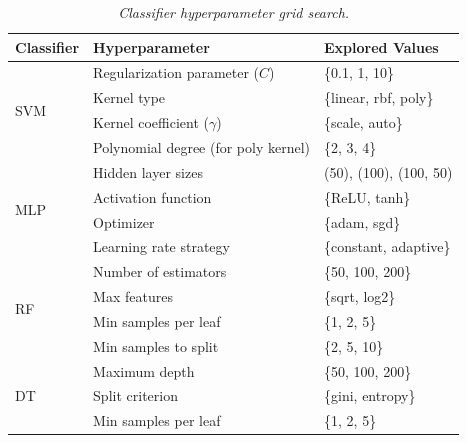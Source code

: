 \begin{table}[h]
    \centering
    \renewcommand{\arraystretch}{1.5}
    \setlength{\tabcolsep}{8pt}
    \caption{\textit{Classifier hyperparameter grid search.}}
    \label{tab:hyperparams}
    \begin{tabular}{|p{1.5cm}|p{5.2cm}|p{5.3cm}|}
        \hline
        \textbf{Classifier} & \textbf{Hyperparameter} & \textbf{Explored Values} \\ \hline

        \multirow{4}{*}{SVM} 
        & Regularization parameter ($C$) & \{0.1, 1, 10\} \\ \cline{2-3}
        & Kernel type & \{linear, rbf, poly\} \\ \cline{2-3}
        & Kernel coefficient ($\gamma$) & \{scale, auto\} \\ \cline{2-3}
        & Polynomial degree (for poly kernel) & \{2, 3, 4\} \\ \hline

        \multirow{4}{*}{MLP} 
        & Hidden layer sizes & (50), (100), (100, 50) \\ \cline{2-3}
        & Activation function & \{ReLU, tanh\} \\ \cline{2-3}
        & Optimizer & \{adam, sgd\} \\ \cline{2-3}
        & Learning rate strategy & \{constant, adaptive\} \\ \hline

        \multirow{4}{*}{RF} 
        & Number of estimators & \{50, 100, 200\} \\ \cline{2-3}
        & Max features & \{sqrt, log2\} \\ \cline{2-3}
        & Min samples per leaf & \{1, 2, 5\} \\ \cline{2-3}
        & Min samples to split & \{2, 5, 10\} \\ \hline

        \multirow{3}{*}{DT} 
        & Maximum depth & \{50, 100, 200\} \\ \cline{2-3}
        & Split criterion & \{gini, entropy\} \\ \cline{2-3}
        & Min samples per leaf & \{1, 2, 5\} \\ \hline
    \end{tabular}
\end{table}



\vspace{1cm}

